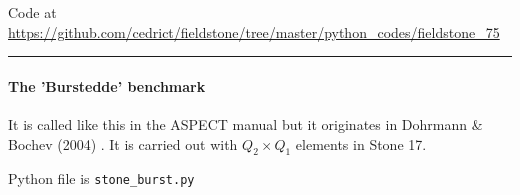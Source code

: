

\begin{center}
Code at \url{https://github.com/cedrict/fieldstone/tree/master/python_codes/fieldstone_75}
\end{center}

\par\noindent\rule{\textwidth}{0.4pt}


\paragraph{The 'Burstedde' benchmark} It is called like this in the ASPECT manual 
but it originates in Dohrmann \& Bochev (2004) \cite{dobo04}. It is carried 
out with $Q_2 \times Q_1$ elements in Stone 17. 

Python file is {\tt stone\_burst.py}


